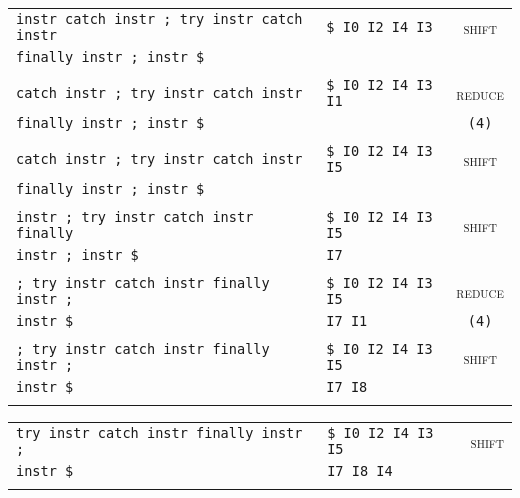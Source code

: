 \documentclass[a4paper,10pt]{article}
\begin{document}
\begin{enumerate}
\begin{enumerate}
\begin{center}
\begin{tabular}{ | l | l | c |}
                    \verb|instr catch instr ; try instr catch instr| & \verb|$ I0 I2 I4 I3| & \textsc{shift} \\
                    \verb|finally instr ; instr $| & &  \\ 
                    & & \\ \hline

                    \verb|catch instr ; try instr catch instr| & \verb|$ I0 I2 I4 I3 I1| & \textsc{reduce} \\
                    \verb|finally instr ; instr $| & & \verb|(4)| \\ 
                    & & \\ \hline

                    \verb|catch instr ; try instr catch instr| & \verb|$ I0 I2 I4 I3 I5| & \textsc{shift} \\
                    \verb|finally instr ; instr $| & & \\ 
                    & & \\ \hline

                    \verb|instr ; try instr catch instr finally| & \verb|$ I0 I2 I4 I3 I5| & \textsc{shift} \\
                    \verb|instr ; instr $| & \verb|I7| & \\ 
                    & & \\ \hline

                    \verb|; try instr catch instr finally instr ;| & \verb|$ I0 I2 I4 I3 I5| & \textsc{reduce} \\
                    \verb|instr $| & \verb|I7 I1| & \verb|(4)| \\ 
                    & & \\ \hline

                    \verb|; try instr catch instr finally instr ;| & \verb|$ I0 I2 I4 I3 I5| & \textsc{shift} \\
                    \verb|instr $| & \verb|I7 I8| & \\ 
                    & & \\ \hline
                \end{tabular}
            \end{center}

            \begin{center}
                \begin{tabular}{ | l | l | c |}
                    \hline
                    \verb|try instr catch instr finally instr ;| & \verb|$ I0 I2 I4 I3 I5| & \textsc{shift} \\
                    \verb|instr $| & \verb|I7 I8 I4| & \\ 
                    & & \\ \hline


\end{tabular}
\end{center}
\end{enumerate}
\end{enumerate}
\end{document}
